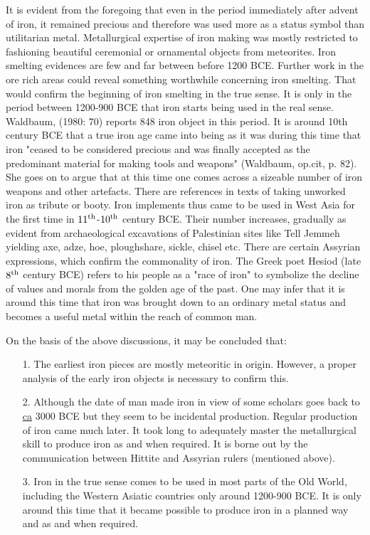 It is evident from the foregoing that even in the period immediately after advent of iron, it remained precious and therefore was used more as a status symbol than utilitarian metal. Metallurgical expertise of iron making was mostly restricted to fashioning beautiful ceremonial or ornamental objects from meteorites. Iron smelting evidences are few and far between before 1200 BCE. Further work in the ore rich areas could reveal something worthwhile concerning iron smelting. That would confirm the beginning of iron smelting in the true sense. It is only in the period between 1200-900 BCE that iron starts being used in the real sense. Waldbaum, (1980: 70) reports 848 iron object in this period. It is around 10th century BCE that a true iron age came into being as it was during this time that iron "ceased to be considered precious and was finally accepted as the predominant material for making tools and weapons" (Waldbaum, op.cit, p. 82). She goes on to argue that at this time one comes across a sizeable number of iron weapons and other artefacts. There are references in texts of taking unworked iron as tribute or booty. Iron implements thus came to be used in West Asia for the first time in $11^{\rm th}$-$10^{\rm th}$ century BCE. Their number increases, gradually as evident from archaeological excavations of Palestinian sites like Tell Jemmeh yielding axe, adze, hoe, ploughshare, sickle, chisel etc. There are certain Assyrian expressions, which confirm the commonality of iron. The Greek poet Hesiod (late $8^{\rm th}$ century BCE) refers to his people as a "race of iron" to symbolize the decline of values and morals from the golden age of the past. One may infer that it is around this time that iron was brought down to an ordinary metal status and becomes a useful metal within the reach of common man. 

On the basis of the above discussions, it may be concluded that:
\begin{itemize}
\item[1.] The earliest iron pieces are mostly meteoritic in origin. However, a proper analysis of the early iron objects is necessary to confirm this.
\item[2.] Although the date of man made iron in view of some scholars goes back to \underline{ca} 3000 BCE but they seem to be incidental production. Regular production of iron came much later. It took long to adequately master the metallurgical skill to produce iron as and when required. It is borne out by the communication between Hittite and  Assyrian rulers (mentioned above).
\item[3.] Iron in the true sense comes to be used in most parts of the Old World, including the Western Asiatic countries only around 1200-900 BCE. It is only around this time that it became possible to produce iron in a planned way and as and when required.
\end{itemize}

